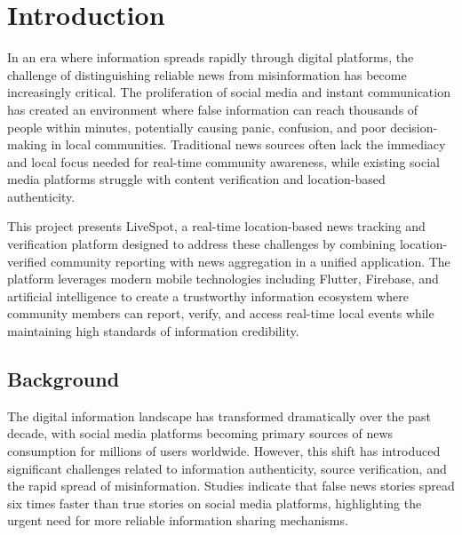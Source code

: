 \chapter{Introduction}
\label{ch:into} %

In an era where information spreads rapidly through digital platforms, the challenge of distinguishing reliable news from misinformation has become increasingly critical. The proliferation of social media and instant communication has created an environment where false information can reach thousands of people within minutes, potentially causing panic, confusion, and poor decision-making in local communities. Traditional news sources often lack the immediacy and local focus needed for real-time community awareness, while existing social media platforms struggle with content verification and location-based authenticity.

This project presents LiveSpot, a real-time location-based news tracking and verification platform designed to address these challenges by combining location-verified community reporting with news aggregation in a unified application. The platform leverages modern mobile technologies including Flutter, Firebase, and artificial intelligence to create a trustworthy information ecosystem where community members can report, verify, and access real-time local events while maintaining high standards of information credibility.

\section{Background}
\label{sec:into_back}

The digital information landscape has transformed dramatically over the past decade, with social media platforms becoming primary sources of news consumption for millions of users worldwide. However, this shift has introduced significant challenges related to information authenticity, source verification, and the rapid spread of misinformation. Studies indicate that false news stories spread six times faster than true stories on social media platforms, highlighting the urgent need for more reliable information sharing mechanisms.

